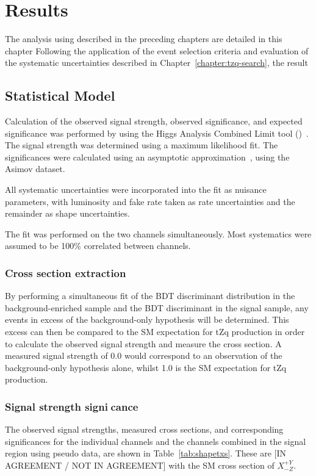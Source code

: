 \chapter{Results}\label{chapter:results}
The analysis using described in the preceding chapters are detailed in this chapter
Following the application of the event selection criteria and evaluation of the systematic uncertainties described in Chapter~\ref{chapter:tzq-search}, the result 

\section{Statistical Model}
Calculation of the observed signal strength, observed significance, and
expected significance was performed by using the Higgs Analysis Combined Limit
tool (\combine{})~\cite{Combine}. The signal strength was determined using a
maximum likelihood fit.  The significances were calculated using an asymptotic
approximation~\cite{AsymptoticFormulae}, using the Asimov dataset.

All systematic uncertainties were incorporated into the fit as nuisance
parameters, with luminosity and fake rate taken as rate uncertainties and the
remainder as shape uncertainties.
 
The fit was performed on the two channels simultaneously. Most systematics were
assumed to be 100\% correlated between channels.

\subsection{Cross section extraction}
 
By performing a simultaneous fit of the BDT discriminant distribution in the
background-enriched sample and the BDT discriminant in the signal sample, any
events in excess of the background-only hypothesis will be determined. This
excess can then be compared to the SM expectation for tZq production in order
to calculate the observed signal strength and measure the cross section. A
measured signal strength of 0.0 would correspond to an observation of the
background-only hypothesis alone, whilst 1.0 is the SM expectation for tZq
production.

\subsection{Signal strength signicance}

The observed signal strengths, measured cross sections, and corresponding
significances for the individual channels and the channels combined in the
signal region using pseudo data, are shown in Table~\ref{tab:shapetxs}. These
are [IN AGREEMENT / NOT IN AGREEMENT] with the SM cross section of
$X^{+Y}_{-Z}$.
 
